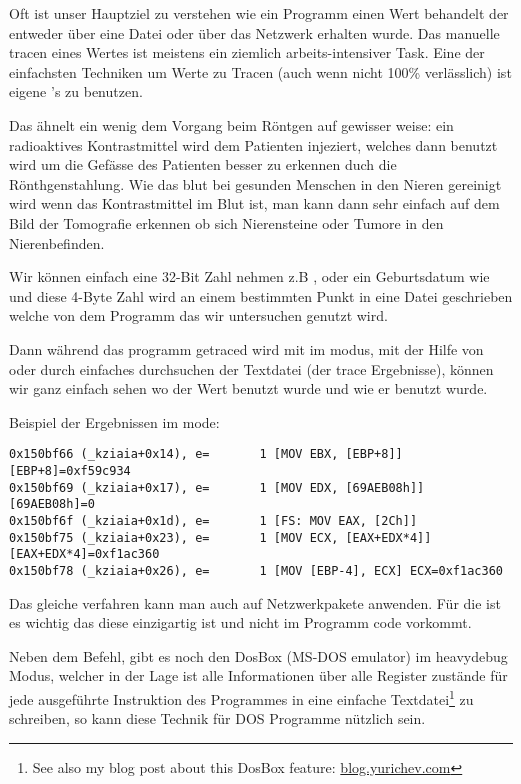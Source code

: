 
Oft ist unser Hauptziel zu verstehen wie ein Programm einen Wert behandelt der entweder \"uber eine Datei oder \"uber das Netzwerk erhalten wurde.
Das manuelle tracen eines Wertes ist meistens ein ziemlich arbeits-intensiver Task. Eine der einfachsten Techniken um Werte zu Tracen (auch wenn nicht 100\% verl\"asslich)
ist eigene 's zu benutzen. 

Das \"ahnelt ein wenig dem Vorgang beim R\"ontgen auf gewisser weise: ein radioaktives Kontrastmittel wird dem Patienten injeziert,
welches dann benutzt wird um die Gef\"asse des Patienten besser zu erkennen duch die R\"onthgenstahlung. Wie das blut bei 
gesunden Menschen in den Nieren gereinigt wird wenn das Kontrastmittel im Blut ist, man kann dann sehr einfach auf dem
Bild der Tomografie erkennen ob sich Nierensteine oder Tumore in den Nierenbefinden. 

Wir k\"onnen einfach eine 32-Bit Zahl nehmen z.B , oder ein Geburtsdatum wie 
und diese 4-Byte Zahl wird an einem bestimmten Punkt in eine Datei geschrieben welche von dem Programm 
das wir untersuchen genutzt wird. 

\myindex{\GrepUsage}

Dann w\"ahrend das programm getraced wird mit \tracer im  modus, mit der Hilfe von 
oder durch einfaches durchsuchen der Textdatei (der trace Ergebnisse), k\"onnen wir ganz einfach sehen wo der 
Wert benutzt wurde und wie er benutzt wurde. 

Beispiel der  \tracer Ergebnissen im  mode:

\begin{lstlisting}[style=customasmx86]
0x150bf66 (_kziaia+0x14), e=       1 [MOV EBX, [EBP+8]] [EBP+8]=0xf59c934 
0x150bf69 (_kziaia+0x17), e=       1 [MOV EDX, [69AEB08h]] [69AEB08h]=0 
0x150bf6f (_kziaia+0x1d), e=       1 [FS: MOV EAX, [2Ch]] 
0x150bf75 (_kziaia+0x23), e=       1 [MOV ECX, [EAX+EDX*4]] [EAX+EDX*4]=0xf1ac360 
0x150bf78 (_kziaia+0x26), e=       1 [MOV [EBP-4], ECX] ECX=0xf1ac360 
\end{lstlisting}

Das gleiche verfahren kann man auch auf Netzwerkpakete anwenden.
F\"ur die  ist es wichtig das diese einzigartig ist und nicht im Programm code vorkommt.

\newcommand{\DOSBOXURL}{\href{http://go.yurichev.com/17222}{blog.yurichev.com}}

Neben dem \tracer Befehl, gibt es noch den DosBox (MS-DOS emulator) im heavydebug Modus,
welcher in der Lage ist alle Informationen \"uber alle Register zust\"ande f\"ur jede ausgef\"uhrte Instruktion des Programmes in
eine einfache Textdatei\footnote{See also my blog post about this DosBox feature: \DOSBOXURL{}} zu schreiben, so kann
diese Technik f\"ur DOS Programme n\"utzlich sein. 

